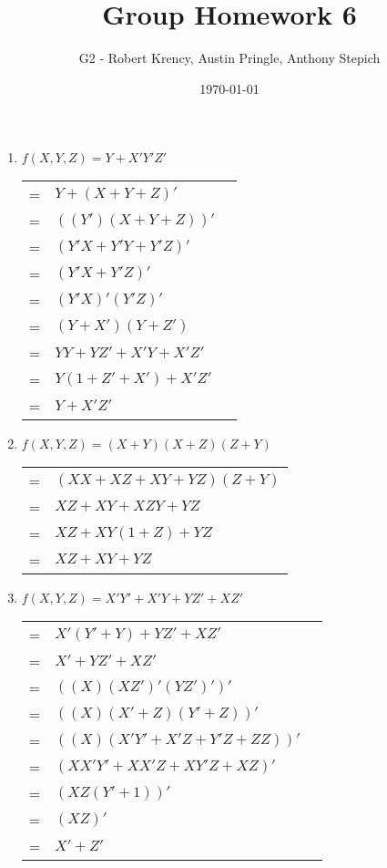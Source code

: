 \documentclass[12pt]{article}
\title{Group Homework 6}
\author{G2 - Robert Krency, Austin Pringle, Anthony Stepich}
\date{\today}
\begin{document}
\maketitle

\begin{enumerate}

    \item $f(X, Y, Z) = Y + X'Y'Z'$ \\
    \begin{tabular}{r l l}
        = & $Y + (X + Y + Z)'$ & \\
        = & $((Y')(X + Y + Z))' $ & \\
        = & $(Y'X + Y'Y + Y'Z)'$ & \\
        = & $(Y'X + Y'Z)'$ & \\
        = & $(Y'X)'(Y'Z)'$ & \\
        = & $(Y + X')(Y + Z')$ & \\
        = & $YY + YZ' + X'Y + X'Z'$ & \\
        = & $Y(1 + Z' + X') + X'Z'$ & \\
        = & $Y + X'Z'$ & \\
    \end{tabular}
    
    \pagebreak
    
    \item $f(X, Y, Z) = (X + Y)(X + Z)(Z + Y)$ \\
    \begin{tabular}{r l}
        = & $(XX + XZ + XY + YZ)(Z + Y)$ \\
        = & $XZ + XY + XZY + YZ$ \\ 
        = & $XZ + XY(1 + Z) + YZ$ \\
        = & $XZ + XY + YZ$ \\ 
    \end{tabular}

    \vspace{20mm}

    \item $f(X, Y, Z) = X'Y' + X'Y + YZ' + XZ'$ \\
    \begin{tabular}{r l l}
        = & $X'(Y' + Y) + YZ' + XZ'$ & \\
        = & $X' + YZ' + XZ'$ & \\
        = & $((X)(XZ')'(YZ')')'$ &\\
        = & $((X)(X' + Z)(Y' + Z))'$ &\\
        = & $((X)(X'Y' + X'Z + Y'Z + ZZ))'$ & \\
        = & $(XX'Y' + XX'Z + XY'Z + XZ)'$ & \\
        = & $(XZ(Y' + 1))'$ & \\
        = & $(XZ)'$ & \\
        = & $X' + Z'$ & \\ 
    \end{tabular}
    

\end{enumerate}
\end{document}
